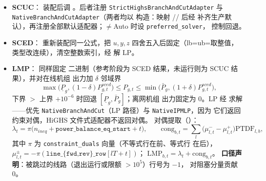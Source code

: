\begin{itemize}
  \item \textbf{SCUC}： 装配后调
        。后者注册
        \texttt{StrictHighsBranchAndCutAdapter} 与
        \texttt{NativeBranchAndCutAdapter}（两者均以
         构造：映射
        // 后经
        补齐生产默认），再注册全部默认适配器；$\ne$Auto 时设
        \texttt{preferred\_solver}， 控制回退。
  \item \textbf{SCED}：
        重新装配同一公式，把 $u,y,z$ 四舍五入后固定（lb=ub=取整值，
        类型改连续），清空整数索引，经 
        解 LP。
  \item \textbf{LMP}： 同样固定
        二进制（参考阶段为 SCED 结果，未运行则为 SCUC 结果），并对在线机组
        出力加 $\delta$ 邻域界
        \begin{equation}
        \max\big(\underline P_g,(1-\delta)P^{sced}_{g,t}\big)\le P_{g,t}\le
        \min\big(\bar P_g,(1+\delta)P^{sced}_{g,t}\big),
        \label{eq:impl-delta}
        \end{equation}
        下界 $>$ 上界 $+10^{-6}$ 时回退 $[\underline P_g,\bar P_g]$；离网机组
        出力固定为 0。LP 经
         求解——优先
        \texttt{NativeBranchAndCut}（LP 路径）与 \texttt{NativeIPMLP}，因为
        它们返回约束对偶，HiGHS 文件式适配器不返回对偶。
        对偶提取（）：
        \begin{equation}
        \lambda_t=\pi\big(n_{ineq}+\texttt{power\_balance\_eq\_start}+t\big),\qquad
        \mathrm{cong}_{b,t}=\sum_l\big(\mu^-_{l,t}-\mu^+_{l,t}\big)\mathrm{PTDF}_{l,b},
        \label{eq:impl-lmp}
        \end{equation}
        其中 $\pi$ 为 \texttt{constraint\_duals} 向量（不等式行在前、等式行
        在后），$\mu^\pm_{l,t}=-\pi(\texttt{line\_\{fwd,rev\}\_row}[lT+t])$；
        $\mathrm{LMP}_{b,t}=\lambda_t+\mathrm{cong}_{b,t}$。
        \textbf{口径声明}：被跳过的线路（退出运行或限额 $>10^5$）行号为 $-1$，
        对阻塞分量贡献 0。
\end{itemize}

